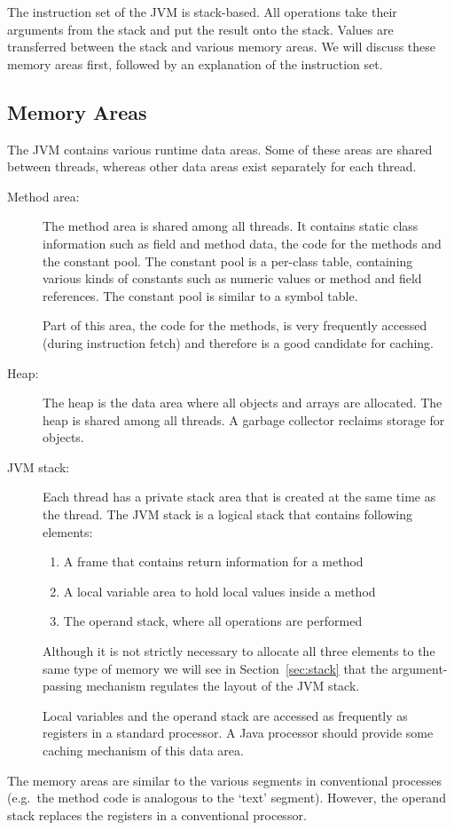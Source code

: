 The instruction set of the JVM is stack-based. All operations take
their arguments from the stack and put the result onto the stack.
Values are transferred between the stack and various memory areas.
We will discuss these memory areas first, followed by an explanation
of the instruction set.

\subsection{Memory Areas}

The JVM contains various runtime data areas. Some of these areas are
shared between threads, whereas other data areas exist separately
for each thread.

\begin{description}
    \item[Method area:]
The method area is shared among all threads. It contains static
class information such as field and method data, the code for the
methods and the constant pool. The constant pool is a per-class
table, containing various kinds of constants such as numeric values
or method and field references. The constant pool is similar to a
symbol table.

Part of this area, the code for the methods, is very frequently
accessed (during instruction fetch) and therefore is a good
candidate for caching.

    \item[Heap:]
The heap is the data area where all objects and arrays are
allocated. The heap is shared among all threads. A garbage collector
reclaims storage for objects.

    \item[JVM stack:]
Each thread has a private stack area that is created at the same
time as the thread. The JVM stack is a logical stack that contains
following elements:
\begin{enumerate}
    \item A frame that contains return information for a method
    \item A local variable area to hold local values inside a method
    \item The operand stack, where all operations are performed
\end{enumerate}
%
Although it is not strictly necessary to allocate all three elements
to the same type of memory we will see in Section~\ref{sec:stack}
that the argument-passing mechanism regulates the layout of the JVM
stack.

Local variables and the operand stack are accessed as frequently
as registers in a standard processor. A Java processor should
provide some caching mechanism of this data area.

\end{description}
%
The memory areas are similar to the various segments in conventional
processes (e.g.\ the method code is analogous to the `text'
segment). However, the operand stack replaces the registers in a
conventional processor.

